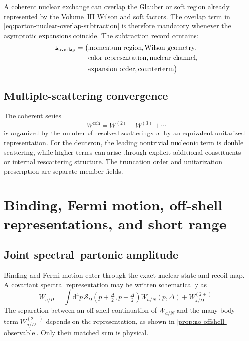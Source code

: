 \documentclass[11pt]{article}
\newcommand{\dd}{\mathrm{d}}
\newcommand{\cS}{\mathcal S}
\newcommand{\coh}{\mathrm{coh}}
\begin{document}
A coherent nuclear exchange can overlap the Glauber or soft region already
represented by the Volume~III Wilson and soft factors.  The overlap term in
\cref{eq:parton-nuclear-overlap-subtraction} is therefore mandatory whenever
the asymptotic expansions coincide.  The subtraction record contains:
\begin{equation}
\begin{aligned}
 \mathfrak s_{\rm overlap}=\bigl(&
 \text{momentum region},
 \text{Wilson geometry},\\
 &\text{color representation},
 \text{nuclear channel},\\
 &\text{expansion order},
 \text{counterterm}
 \bigr).
\end{aligned}
\label{eq:overlap-subtraction-record}
\end{equation}

\subsection{Multiple-scattering convergence}

The coherent series
\begin{equation}
 W^{\coh}=W^{(2)}+W^{(3)}+\cdots
\label{eq:coherent-series}
\end{equation}
is organized by the number of resolved scatterings or by an equivalent
unitarized representation.  For the deuteron, the leading nontrivial
nucleonic term is double scattering, while higher terms can arise through
explicit additional constituents or internal rescattering structure.  The
truncation order and unitarization prescription are separate member fields.

\section{Binding, Fermi motion, off-shell representations, and short range}
\label{sec:binding-offshell-src}

\subsection{Joint spectral--partonic amplitude}

Binding and Fermi motion enter through the exact nuclear state and recoil
map.  A covariant spectral representation may be written schematically as
\begin{equation}
 W_{a/D}
 =\int\dd^4p\,
 \cS_D(p+\tfrac\Delta2,p-\tfrac\Delta2)
 W_{a/N}(p,\Delta)
 +W_{a/D}^{(2+)}.
\label{eq:covariant-spectral-representation}
\end{equation}
The separation between an off-shell continuation of \(W_{a/N}\) and the
many-body term \(W_{a/D}^{(2+)}\) depends on the representation, as shown in
\cref{prop:no-offshell-observable}.  Only their matched sum is physical.
\end{document}
